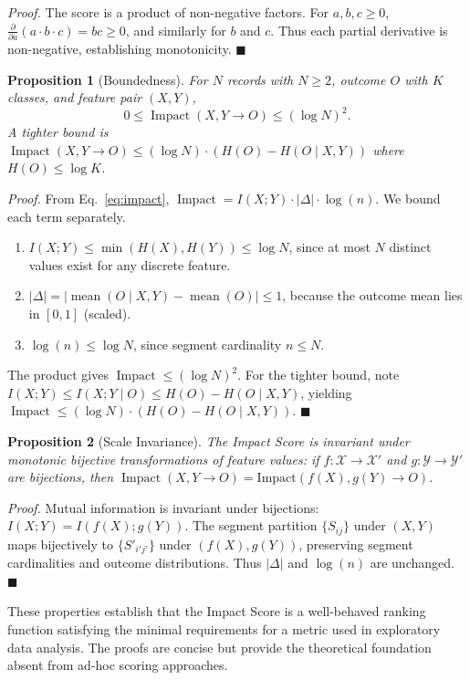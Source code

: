 \documentclass[conference]{IEEEtran}
\newtheorem{proposition}{Proposition}
\begin{document}
\textit{Proof.} The score is a product of non-negative factors. For $a,b,c \geq 0$, $\frac{\partial}{\partial a}(a \cdot b \cdot c) = bc \geq 0$, and similarly for $b$ and $c$. Thus each partial derivative is non-negative, establishing monotonicity. \hfill $\blacksquare$

\begin{proposition}[Boundedness]
\label{prop:boundedness}
For $N$ records with $N \geq 2$, outcome $O$ with $K$ classes, and feature pair $(X,Y)$,
\[
0 \leq \operatorname{Impact}(X,Y \to O) \leq (\log N)^2.
\]
A tighter bound is $\operatorname{Impact}(X,Y \to O) \leq (\log N) \cdot (H(O) - H(O \mid X,Y))$ where $H(O) \leq \log K$.
\end{proposition}

\textit{Proof.} From Eq.~\ref{eq:impact}, $\operatorname{Impact} = I(X;Y) \cdot |\Delta| \cdot \log(n)$. We bound each term separately.
\begin{enumerate}
    \item $I(X;Y) \leq \min(H(X), H(Y)) \leq \log N$, since at most $N$ distinct values exist for any discrete feature.
    \item $|\Delta| = |\operatorname{mean}(O \mid X,Y) - \operatorname{mean}(O)| \leq 1$, because the outcome mean lies in $[0,1]$ (scaled).
    \item $\log(n) \leq \log N$, since segment cardinality $n \leq N$.
\end{enumerate}
The product gives $\operatorname{Impact} \leq (\log N)^2$. For the tighter bound, note $I(X;Y) \leq I(X;Y \mid O) \leq H(O) - H(O \mid X,Y)$, yielding $\operatorname{Impact} \leq (\log N) \cdot (H(O) - H(O \mid X,Y))$. \hfill $\blacksquare$

\begin{proposition}[Scale Invariance]
\label{prop:invariance}
The Impact Score is invariant under monotonic bijective transformations of feature values: if $f: \mathcal{X} \to \mathcal{X}'$ and $g: \mathcal{Y} \to \mathcal{Y}'$ are bijections, then $\operatorname{Impact}(X,Y \to O) = \text{Impact}(f(X), g(Y) \to O)$.
\end{proposition}

\textit{Proof.} Mutual information is invariant under bijections: $I(X;Y) = I(f(X); g(Y))$. The segment partition $\{S_{ij}\}$ under $(X,Y)$ maps bijectively to $\{S'_{i'j'}\}$ under $(f(X), g(Y))$, preserving segment cardinalities and outcome distributions. Thus $|\Delta|$ and $\log(n)$ are unchanged. \hfill $\blacksquare$

These properties establish that the Impact Score is a well-behaved ranking function satisfying the minimal requirements for a metric used in exploratory data analysis. The proofs are concise but provide the theoretical foundation absent from ad-hoc scoring approaches.
\end{document}
